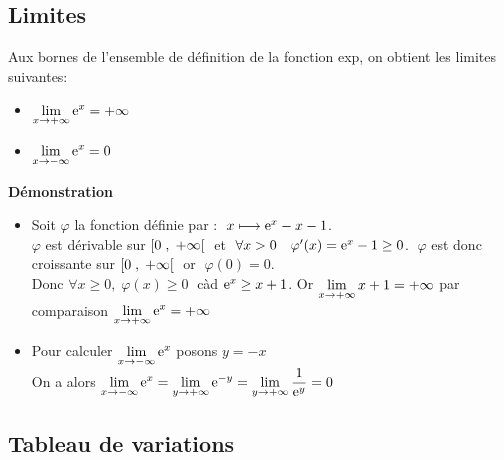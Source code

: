 \subsection*{Limites} 
Aux bornes de l'ensemble de définition de la fonction exp, on obtient les limites suivantes:
\begin{property}
\begin{itemize}
\item  $\displaystyle \lim_{x \to +\infty}\mathrm{e}^{x} =+\infty $ 
 \item $ \displaystyle\lim_{x \to -\infty}\mathrm{e}^{ x}=0 $
\end{itemize}
\end{property}

\textbf{Démonstration}
\begin{itemize}
\item  Soit $ \varphi $  la fonction définie par : $\; x\longmapsto \mathrm{e}^{x}-x-1 $. \\
$ \varphi $  est dérivable sur $ \left[0 \;,\; +\infty\right[ \;$    et  $ \;\forall x> 0 \quad  \varphi^{\prime}(x)= \mathrm{e}^{x}-1\geq 0$.  $ \;\varphi $  est donc croissante sur  $ \left[0 \;,\; +\infty\right[ \;$    or  $ \;\varphi(0)=0. $  \\ Donc $ \forall x \geq 0,\; \varphi(x)\geq 0 \;$  càd  $ \mathrm{e}^{x}\geq x+1 $.  Or $ \displaystyle\lim_{x \to +\infty}x+1=+\infty $  
par comparaison  $ \displaystyle\lim_{x \to +\infty}\mathrm{e}^{x} =+\infty $ \\
\item Pour calculer $ \displaystyle\lim_{x \to -\infty}\mathrm{e}^{ x} $\;  posons\; $ y=-x $   \\
On a alors \;$\displaystyle\lim_{x \to -\infty}\mathrm{e}^{ x} = \displaystyle\lim_{y \to +\infty}\mathrm{e}^{-y}=\lim_{y \to +\infty}\dfrac{1}{\mathrm{e}^{y}}=0 $

\end{itemize}
\subsection*{ Tableau de variations}
\begin{center}

\end{center}

